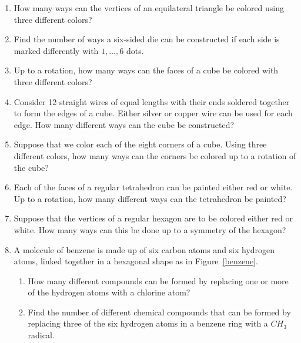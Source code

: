{\begin{enumerate}
 
\bf\item\rm
How many ways can the vertices of an equilateral triangle be colored
using three different colors? 
 
 
\bf\item\rm
Find the number of ways a six-sided die can be constructed if each
side is  marked differently with $1, \ldots, 6$ 
dots.
 
\bf\item\rm
Up to a rotation, how many ways can the faces of a cube be colored
with three different colors? 
 
 
 
\bf\item\rm
Consider 12 straight wires of equal lengths with their ends soldered
together to form the edges of a cube. Either silver or copper wire can be
used for each edge.  How many different ways can the cube be
constructed? 
 
 
 
\bf\item\rm
Suppose that we color each of the eight corners of a cube. Using three
different colors, how many ways can the corners be colored up to a
rotation of the cube? 
 
 
\bf\item\rm
Each of the faces of a regular tetrahedron can be painted either red
or white.  Up to a rotation, how many different ways can the
tetrahedron be painted? 
 
 
\bf\item\rm
Suppose that the vertices of a regular hexagon are to be colored either
red or white.  How many ways can this be done up to a symmetry  of the
hexagon? 
 
 
\bf\item\rm
A molecule of benzene is made up of six carbon atoms and six hydrogen
atoms, linked together in a hexagonal shape as in Figure~\ref{benzene}.
\begin{enumerate}
 
 \bf\item\rm
How many different compounds can be formed by replacing one or more of
the hydrogen atoms with a chlorine atom? 
 
 \bf\item\rm
Find the number of different chemical compounds that can be formed by
replacing three of the six hydrogen atoms in a benzene ring with a
$CH_3$ radical.
 
\end{enumerate}
 

\end{enumerate}}
